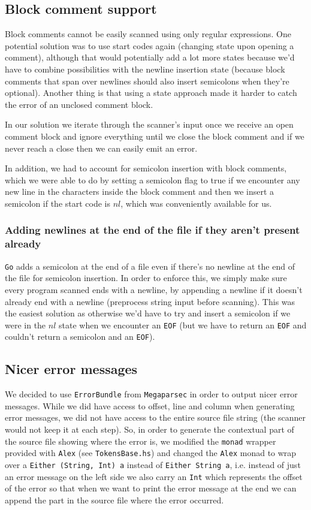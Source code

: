 \documentclass[11pt]{article}
\begin{document}
\subsection{Block comment support}
\label{sec:orgf31f629}
Block comments cannot be easily scanned using only regular
expressions. One potential solution was to use start codes again
(changing state upon opening a comment), although that would
potentially add a lot more states because we'd have to combine
possibilities with the newline insertion state (because block
comments that span over newlines should also insert semicolons when
they're optional). Another thing is that using a state approach
made it harder to catch the error of an unclosed comment block.

In our solution we iterate through the scanner's input once we
receive an open comment block and ignore everything until we close
the block comment and if we never reach a close then we can easily
emit an error.

In addition, we had to account for semicolon insertion with block
comments, which we were able to do by setting a semicolon flag to
true if we encounter any new line in the characters inside the
block comment and then we insert a semicolon if the start code is
\(nl\), which was conveniently available for us.
\subsubsection{Adding newlines at the end of the file if they aren't present already}
\label{sec:org7941711}
\texttt{Go} adds a semicolon at the end of a file even if there's no
newline at the end of the file for semicolon insertion. In order
to enforce this, we simply make sure every program scanned ends
with a newline, by appending a newline if it doesn't already end
with a newline (preprocess string input before scanning). This was
the easiest solution as otherwise we'd have to try and insert a
semicolon if we were in the \(nl\) state when we encounter an \texttt{EOF}
(but we have to return an \texttt{EOF} and couldn't return a semicolon
and an \texttt{EOF}).
\subsection{Nicer error messages}
\label{sec:org3cecdaa}
We decided to use \texttt{ErrorBundle} from \texttt{Megaparsec} in order to
output nicer error messages. While we did have access to offset,
line and column when generating error messages, we did not have
access to the entire source file string (the scanner would not keep
it at each step). So, in order to generate the contextual part of
the source file showing where the error is, we modified the \texttt{monad}
wrapper provided with \texttt{Alex} (see \texttt{TokensBase.hs}) and changed the
\texttt{Alex} monad to wrap over a \texttt{Either (String, Int) a} instead of
\texttt{Either String a}, i.e. instead of just an error message on the
left side we also carry an \texttt{Int} which represents the offset of the
error so that when we want to print the error message at the end we
can append the part in the source file where the error occurred.
\end{document}
